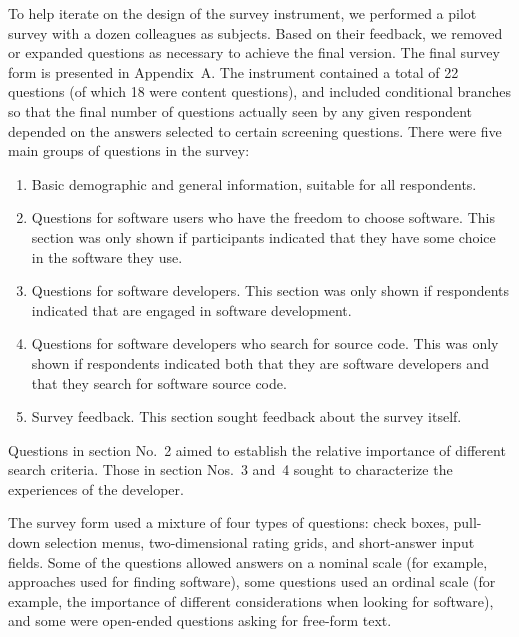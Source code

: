 \documentclass{casicswhitepaper}
\begin{document}
To help iterate on the design of the survey instrument, we performed a pilot survey with a dozen colleagues as subjects.  Based on their feedback, we removed or expanded questions as necessary to achieve the final version.  The final survey form is presented in Appendix~A.  The instrument contained a total of 22 questions (of which 18 were content questions), and included conditional branches so that the final number of questions actually seen by any given respondent depended on the answers selected to certain screening questions.  There were five main groups of questions in the survey:

\begin{enumerate}

\item Basic demographic and general information, suitable for all respondents.

\item Questions for software users who have the freedom to choose software.  This section was only shown if participants indicated that they have some choice in the software they use.

\item Questions for software developers.  This section was only shown if respondents indicated that are engaged in software development.

\item Questions for software developers who search for source code.  This was only shown if respondents indicated both that they are software developers and that they search for software source code.

\item Survey feedback.  This section sought feedback about the survey itself.

\end{enumerate}

Questions in section No.~2 aimed to establish the relative importance of different search criteria.  Those in section Nos.~3 and~4 sought to characterize the experiences of the developer.

The survey form used a mixture of four types of questions: check boxes, pull-down selection menus, two-dimensional rating grids, and short-answer input fields.  Some of the questions allowed answers on a nominal scale (for example, approaches used for finding software), some questions used an ordinal scale (for example, the importance of different considerations when looking for software), and some were open-ended questions asking for free-form text.
\end{document}
